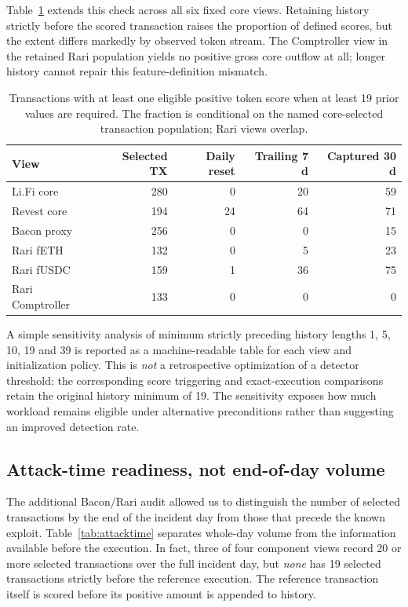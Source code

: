 \documentclass[preprint,12pt,authoryear]{elsarticle}
\begin{document}
Table~\ref{tab:eligibility} extends this check across all six fixed core views. Retaining history strictly before the scored transaction raises the proportion of defined scores, but the extent differs markedly by observed token stream. The Comptroller view in the retained Rari population yields no positive gross core outflow at all; longer history cannot repair this feature-definition mismatch.

\begin{table}[htbp]
\centering\small
\caption{Transactions with at least one eligible positive token score when at least 19 prior values are required. The fraction is conditional on the named core-selected transaction population; Rari views overlap.}
\label{tab:eligibility}
\begin{tabular}{lrrrr}
\toprule
View & Selected TX & Daily reset & Trailing 7 d & Captured 30 d \\
\midrule
Li.Fi core & 280 & 0 & 20 & 59 \\
Revest core & 194 & 24 & 64 & 71 \\
Bacon proxy & 256 & 0 & 0 & 15 \\
Rari fETH & 132 & 0 & 5 & 23 \\
Rari fUSDC & 159 & 1 & 36 & 75 \\
Rari Comptroller & 133 & 0 & 0 & 0 \\
\bottomrule
\end{tabular}
\end{table}


A simple sensitivity analysis of minimum strictly preceding history lengths 1, 5, 10, 19 and 39 is reported as a machine-readable table for each view and initialization policy. This is \emph{not} a retrospective optimization of a detector threshold: the corresponding score triggering and exact-execution comparisons retain the original history minimum of 19. The sensitivity exposes how much workload remains eligible under alternative preconditions rather than suggesting an improved detection rate.

\subsection{Attack-time readiness, not end-of-day volume}
The additional Bacon/Rari audit allowed us to distinguish the number of selected transactions by the end of the incident day from those that precede the known exploit. Table~\ref{tab:attacktime} separates whole-day volume from the information available before the execution. In fact, three of four component views record 20 or more selected transactions over the full incident day, but \emph{none} has 19 selected transactions strictly before the reference execution. The reference transaction itself is scored before its positive amount is appended to history.
\end{document}
